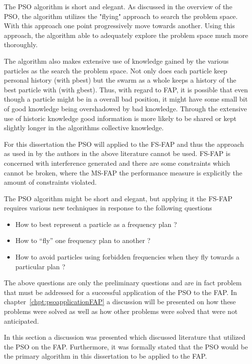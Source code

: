 The PSO algorithm is short and elegant. As discussed in the overview of the PSO, the algorithm utilizes the "flying" approach to search the problem space. With this approach one point progressively move towards another. Using this approach, the algorithm able to adequately explore the problem space much more thoroughly.

The algorithm also makes extensive use of knowledge gained by the various particles as the search the problem space. Not only does each particle keep personal history (with pbest) but the swarm as a whole keeps a history of the best particle with (with gbest). Thus, with regard to FAP, it is possible that even though a particle might be in a overall bad position, it might have some small bit of good knowledge being overshadowed by bad knowledge. Through the extensive use of historic knowledge good information is more likely to be shared or kept slightly longer in the algorithms collective knowledge.

For this dissertation the PSO will applied to the FS-FAP and thus the approach as used in by the authors in the above literature cannot be used. FS-FAP is concerned with interference generated and there are some constraints which cannot be broken, where the MS-FAP the performance measure is explicitly the amount of constraints violated.

The PSO algorithm might be short and elegant, but applying it the FS-FAP requires various new techniques in response to the following questions
\begin{itemize}
\item How to best represent a particle as a frequency plan ?
\item How to ``fly'' one frequency plan to another ?
\item How to avoid particles using forbidden frequencies when they fly towards a particular plan ?
\end{itemize}

The above questions are only the preliminary questions and are in fact problem that must be addressed for a successful application of the PSO to the FAP. In chapter~\ref{chpt:psoapplicationFAP} a discussion will be presented on how these problems were solved as well as how other problems were solved that were not anticipated.

In this section a discussion was presented which discussed literature that utilized the PSO on the FAP. Furthermore, it was formally stated that the PSO would be the primary algorithm in this dissertation to be applied to the FAP.

